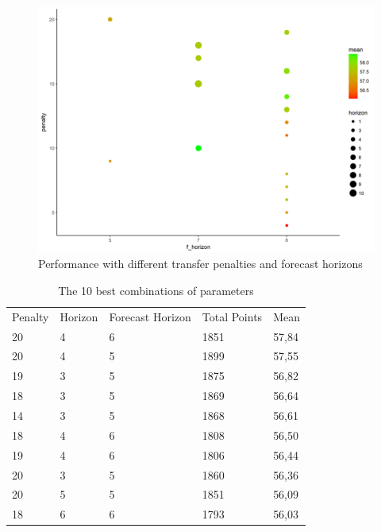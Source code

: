 \begin{figure}[H]
    \centering
    \includegraphics[scale=0.55]{fig/paramter_choice.png}
    \caption{Performance with different transfer penalties and forecast horizons}
\label{Parameter_choice}    
\end{figure}

\begin{table}[H]
\centering
\caption{The 10 best combinations of parameters}
\label{tab:top_10}
\begin{tabular}{lllll}
Penalty & Horizon & Forecast Horizon & Total Points & Mean  \\
20      & 4       & 6                & 1851         & 57,84 \\
20      & 4       & 5                & 1899         & 57,55 \\
19      & 3       & 5                & 1875         & 56,82 \\
18      & 3       & 5                & 1869         & 56,64 \\
14      & 3       & 5                & 1868         & 56,61 \\
18      & 4       & 6                & 1808         & 56,50 \\
19      & 4       & 6                & 1806         & 56,44 \\
20      & 3       & 5                & 1860         & 56,36 \\
20      & 5       & 5                & 1851         & 56,09 \\
18      & 6       & 6                & 1793         & 56,03
\end{tabular}
\end{table}

